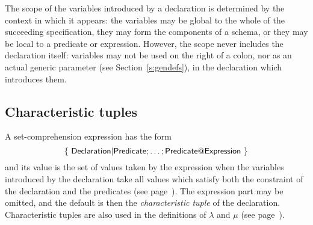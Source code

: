 The scope of the variables introduced by a declaration is
determined by the context in which it appears: the variables may
be global to the whole of the succeeding specification, they may form the
components of a schema, or they may be local to a predicate or expression.
However, the scope never includes the
declaration itself: variables may not be used on the right of a colon,
nor as an actual generic parameter (see
Section~\ref{s:gendefs}), in the declaration which introduces them.

\subsection{Characteristic tuples}\label{ss:chartuple}

A set-comprehension expression has the form
\[ \sf \{~Declaration | Predicate; \ldots; Predicate @ Expression~\} \]
and its value is the set of values taken by the expression when
the variables introduced by the declaration take all values which
satisfy both the constraint of the declaration and the predicates (see
page~\pageref{p:setcomp}).
The expression part may be omitted, and the default is then the
{\em characteristic tuple\/}%
of the declaration.
Characteristic tuples are also used in the definitions of $\lambda$
and $\mu$ (see page~\pageref{p:lambdamu}).

